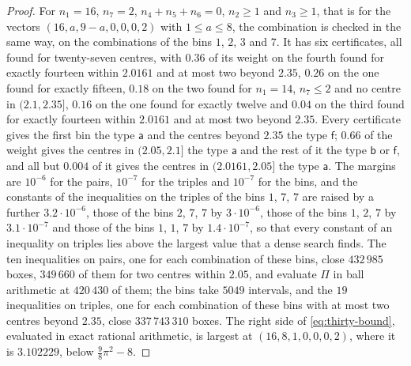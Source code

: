 \documentclass[11pt,reqno]{amsart}
\renewcommand{\_}{\origunderscore\allowbreak}
\numberwithin{equation}{section}
\theoremstyle{plain}
\theoremstyle{definition}
\theoremstyle{remark}
\begin{document}
\begin{proof}
For $n_1=16$, $n_7=2$, $n_4+n_5+n_6=0$, $n_2\ge1$ and $n_3\ge1$, that is
for the vectors $(16,a,9-a,0,0,0,2)$ with $1\le a\le8$, the combination is
checked in the same way, on the combinations of the bins $1$, $2$, $3$ and
$7$. It has six certificates, all found for twenty-seven centres, with
$0.36$ of its weight on the fourth found for exactly fourteen within
$2.0161$ and at most two beyond $2.35$, $0.26$ on the one found for
exactly fifteen, $0.18$ on the two found for $n_1=14$, $n_7\le2$ and no
centre in $(2.1,2.35]$, $0.16$ on the one found for exactly twelve and
$0.04$ on the third found for exactly fourteen within $2.0161$ and at most
two beyond $2.35$. Every certificate gives the first bin the type
$\mathsf a$ and the centres beyond $2.35$ the type $\mathsf f$; $0.66$ of
the weight gives the centres in $(2.05,2.1]$ the type $\mathsf a$ and the
rest of it the type $\mathsf b$ or $\mathsf f$, and all but $0.004$ of it
gives the centres in $(2.0161,2.05]$ the type $\mathsf a$. The margins are
$10^{-6}$ for the pairs, $10^{-7}$ for the triples and $10^{-7}$ for the
bins, and the constants of the inequalities on the triples of the bins
$1$, $7$, $7$ are raised by a further $3.2\cdot10^{-6}$, those of the bins
$2$, $7$, $7$ by $3\cdot10^{-6}$, those of the bins $1$, $2$, $7$ by
$3.1\cdot10^{-7}$ and those of the bins $1$, $1$, $7$ by
$1.4\cdot10^{-7}$, so that every constant of an inequality on triples lies
above the largest value that a dense search finds. The ten inequalities on
pairs, one for each combination of these bins, close $432\,985$ boxes,
$349\,660$ of them for two centres within $2.05$, and evaluate $\Pi$ in
ball arithmetic at $420\,430$ of them; the bins take $5049$ intervals, and
the $19$ inequalities on triples, one for each combination of these bins
with at most two centres beyond $2.35$, close $337\,743\,310$ boxes. The
right side of \eqref{eq:thirty-bound}, evaluated in exact rational
arithmetic, is largest at $(16,8,1,0,0,0,2)$, where it is $3.102229$,
below $\frac98\pi^2-8$.


\end{proof}
\end{document}
